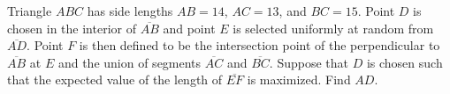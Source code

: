 Triangle $ABC$ has side lengths $AB=14$, $AC=13$, and $BC=15$. Point $D$ is chosen in the interior of $\overline{AB}$ and point $E$ is selected uniformly at random from $\overline{AD}$. Point $F$ is then defined to be the intersection point of the perpendicular to $\overline{AB}$ at $E$ and the union of segments $\overline{AC}$ and $\overline{BC}$. Suppose that $D$ is chosen such that the expected value of the length of $\overline{EF}$ is maximized. Find $AD$.
